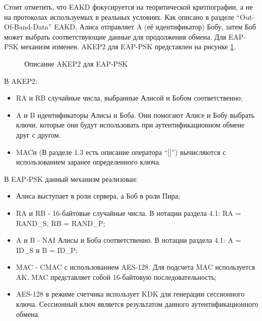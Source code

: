 Стоит отметить, что EAKD фокусируется на теоритической критпографии, а не на протоколах используемых в реальных условиях. Как описано в разделе ``Out-Of-Band-Data'' EAKD, Алиса отправляет A (её идентификатор) Бобу, затем Боб может выбрать соответствующие данные для продолжения обмена. Для EAP-PSK механизм изменен. AKEP2 для EAP-PSK представлен на рисунке \ref{img:eap-akep2}.

\begin{figure}[h!]
\caption{Описание AKEP2 для EAP-PSK}
\label{img:eap-akep2}
\end{figure}

В AKEP2:

\begin{itemize}
\item RA и RB случайные числа, выбранные Алисой и Бобом соответственно;
\item A и B идентификаторы Алисы и Боба. Они помогают Алисе и Бобу выбрать ключи, которые они будут использовать при аутентификационном обмене друг с другом.
\item MACи (В разделе 1.3 есть описание оператора ``[]'') вычисляются с использованием заранее определенного ключа.
\end{itemize}

В EAP-PSK данный механизм реализован:

\begin{itemize}
\item Алиса выступает в роли сервера, а Боб в роли Пира;
\item RA и RB - 16-байтовые случайные числа. В нотации раздела 4.1: RA = RAND\_S, RB = RAND\_P;
\item A и B - NAI Алисы и Боба соответственно. В нотации раздела 4.1: A = ID\_S и B = ID\_P;
\item MAC - CMAC с использованием AES-128. Для подсчета MAC используется AK. MAC представляет собой 16-байтовую последовательность;
\item AES-128 в режиме счетчика использует KDK для генерации сессионного ключа. Сессионный ключ является результатом данного аутентификационного обмена.
\end{itemize}

